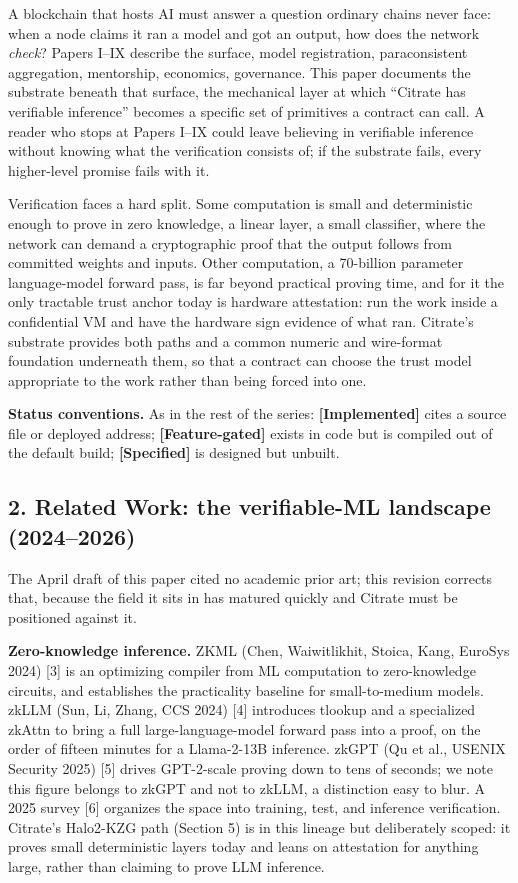 A blockchain that hosts AI must answer a question ordinary chains never
face: when a node claims it ran a model and got an output, how does the
network \emph{check}? Papers I--IX describe the surface, model
registration, paraconsistent aggregation, mentorship, economics,
governance. This paper documents the substrate beneath that surface, the
mechanical layer at which ``Citrate has verifiable inference'' becomes a
specific set of primitives a contract can call. A reader who stops at
Papers I--IX could leave believing in verifiable inference without
knowing what the verification consists of; if the substrate fails, every
higher-level promise fails with it.

Verification faces a hard split. Some computation is small and
deterministic enough to prove in zero knowledge, a linear layer, a small
classifier, where the network can demand a cryptographic proof that the
output follows from committed weights and inputs. Other computation, a
70-billion parameter language-model forward pass, is far beyond
practical proving time, and for it the only tractable trust anchor today
is hardware attestation: run the work inside a confidential VM and have
the hardware sign evidence of what ran. Citrate's substrate provides
both paths and a common numeric and wire-format foundation underneath
them, so that a contract can choose the trust model appropriate to the
work rather than being forced into one.

\textbf{Status conventions.} As in the rest of the series:
\textbf{{[}Implemented{]}} cites a source file or deployed address;
\textbf{{[}Feature-gated{]}} exists in code but is compiled out of the
default build; \textbf{{[}Specified{]}} is designed but unbuilt.

\subsection{2. Related Work: the verifiable-ML landscape
(2024--2026)}\label{related-work-the-verifiable-ml-landscape-20242026}

The April draft of this paper cited no academic prior art; this revision
corrects that, because the field it sits in has matured quickly and
Citrate must be positioned against it.

\textbf{Zero-knowledge inference.} ZKML (Chen, Waiwitlikhit, Stoica,
Kang, EuroSys 2024) {[}3{]} is an optimizing compiler from ML
computation to zero-knowledge circuits, and establishes the practicality
baseline for small-to-medium models. zkLLM (Sun, Li, Zhang, CCS 2024)
{[}4{]} introduces tlookup and a specialized zkAttn to bring a full
large-language-model forward pass into a proof, on the order of fifteen
minutes for a Llama-2-13B inference. zkGPT (Qu et al., USENIX Security
2025) {[}5{]} drives GPT-2-scale proving down to tens of seconds; we
note this figure belongs to zkGPT and not to zkLLM, a distinction easy
to blur. A 2025 survey {[}6{]} organizes the space into training, test,
and inference verification. Citrate's Halo2-KZG path (Section 5) is in
this lineage but deliberately scoped: it proves small deterministic
layers today and leans on attestation for anything large, rather than
claiming to prove LLM inference.

